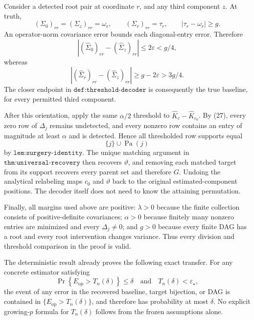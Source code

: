 Consider a detected root pair at coordinate \(r\), and any third
component \(z\).  At truth,
\[
 (\Sigma_0)_{rr}=(\Sigma_z)_{rr}=\omega_r,
 \qquad
 (\Sigma_r)_{rr}=\tau_r,
 \qquad |\tau_r-\omega_r|\ge g .
\]
An operator-norm covariance error bounds each diagonal-entry error.
Therefore
\[
 |(\widehat\Sigma_0)_{rr}-(\widehat\Sigma_z)_{rr}|
 \le2\varepsilon<g/4,
\]
whereas
\[
 |(\widehat\Sigma_r)_{rr}-(\widehat\Sigma_z)_{rr}|
 \ge g-2\varepsilon>3g/4.                                         \tag{28}
\]
The closer endpoint in \(\texttt{def:threshold-decoder}\) is consequently
the true baseline, for every permitted third component.

After this orientation, apply the same \(\alpha/2\) threshold to
\(\widehat K_c-\widehat K_{c_0}\).  By (27), every zero row of
\(\Delta_j\) remains undetected, and every nonzero row contains an entry
of magnitude at least \(\alpha\) and is detected.  Hence all thresholded
row supports equal
\[
 \{j\}\cup\operatorname{Pa}(j)
\]
by \(\texttt{lem:surgery-identity}\).  The unique matching argument in
\(\texttt{thm:universal-recovery}\) then recovers \(\vartheta\), and
removing each matched target from its support recovers every parent set
and therefore \(G\).  Undoing the analytical relabeling maps \(c_0\) and
\(\vartheta\) back to the original estimated-component positions.  The
decoder itself does not need to know the attaining permutation.

Finally, all margins used above are positive: \(\lambda>0\) because the
finite collection consists of positive-definite covariances;
\(\alpha>0\) because finitely many nonzero entries are minimized and every
\(\Delta_j\neq0\); and \(g>0\) because every finite DAG has a root and
every root intervention changes variance.  Thus every division and
threshold comparison in the proof is valid.

The deterministic result already proves the following exact transfer.
For any concrete estimator satisfying
\[
 \Pr\!\left\{E_{\mathrm{op}}>T_n(\delta)\right\}\le\delta
\quad\text{and}\quad
T_n(\delta)<\varepsilon_\star,
\]
the event of any error in the recovered baseline, target bijection, or
DAG is contained in
\(\{E_{\mathrm{op}}>T_n(\delta)\}\), and therefore has probability at
most \(\delta\).  No explicit growing-\(p\) formula for \(T_n(\delta)\)
follows from the frozen assumptions alone.

